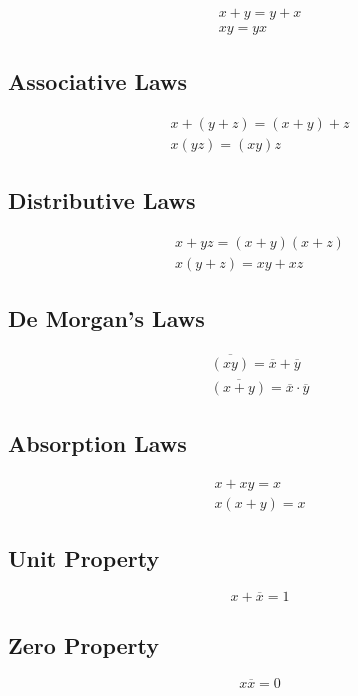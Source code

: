 \documentclass[12pt letter]{report}
\begin{document}
\begin{align*}
	x + y = y + x \\
	xy = yx
\end{align*}

\subsection{Associative Laws}

\begin{align*}
	x + \left( y + z \right)  = \left( x + y \right)  + z \\
	x \left( yz \right)  = \left( xy \right) z
\end{align*}

\subsection{Distributive Laws}

\begin{align*}
	x + yz = \left( x + y \right) \left( x + z \right) \\
	x \left( y + z \right) = xy + xz
\end{align*}

\subsection{De Morgan's Laws}

\begin{align*}
	\overline{\left( xy \right) } = \overline{x} + \overline{y} \\
	\overline{\left( x + y \right) } = \overline{x} \cdot \overline{y}
\end{align*}

\subsection{Absorption Laws}
\begin{align*}
	x + xy = x \\
	x \left( x + y \right)  = x
\end{align*}

\subsection{Unit Property}

\[
	x + \overline{x} = 1
\]

\subsection{Zero Property}
\[
	x \overline{x} = 0
\]
\end{document}

